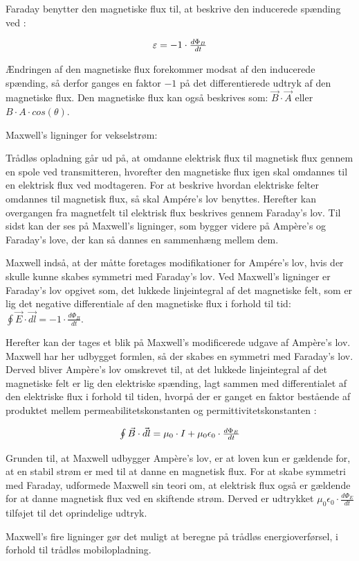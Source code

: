 Faraday benytter den magnetiske flux til, at beskrive den inducerede spænding ved \cite{fysikbog}:

\begin{equation} \label{faraday}
\centerline{$\varepsilon = -1 \cdot \frac{d \Phi_B}{dt}$}
\end{equation}

Ændringen af den magnetiske flux forekommer modsat af den inducerede spænding, så derfor ganges en faktor $-1$ på det differentierede udtryk af den magnetiske flux. Den magnetiske flux kan også beskrives som: $\vec{B} \cdot \vec{A}$ eller $B \cdot A \cdot cos(\theta)$.

Maxwell's ligninger for vekselstrøm:

Trådløs opladning går ud på, at omdanne elektrisk flux til magnetisk flux gennem en spole ved transmitteren, hvorefter den magnetiske flux igen skal omdannes til en elektrisk flux ved modtageren. For at beskrive hvordan elektriske felter omdannes til magnetisk flux, så skal Ampére's lov benyttes. Herefter kan overgangen fra magnetfelt til elektrisk flux beskrives gennem Faraday's lov. Til sidst kan der ses på Maxwell's ligninger, som bygger videre på Ampère's og Faraday's love, der kan så dannes en sammenhæng mellem dem.

Maxwell indså, at der måtte foretages modifikationer for Ampére's lov, hvis der skulle kunne skabes symmetri med Faraday's lov. Ved Maxwell's ligninger er Faraday's lov opgivet som, det lukkede linjeintegral af det magnetiske felt, som er lig det negative differentiale af den magnetiske flux i forhold til tid: $\oint \vec{E} \cdot \vec{dl} = -1 \cdot \frac{d \Phi_B}{dt}$.

Herefter kan der tages et blik på Maxwell's modificerede udgave af Ampère's lov. Maxwell har her udbygget formlen, så der skabes en symmetri med Faraday's lov. Derved bliver Ampère's lov omskrevet til, at det lukkede linjeintegral af det magnetiske felt er lig den elektriske spænding, lagt sammen med differentialet af den elektriske flux i forhold til tiden, hvorpå der er ganget en faktor bestående af produktet mellem permeabilitetskonstanten og permittivitetskonstanten \cite{fysikbog}: 

\begin{equation} \label{maxwell}
\centerline{$\oint \vec{B} \cdot \vec{dl} = \mu_0 \cdot I + \mu_0 \epsilon_0 \cdot \frac{d \Phi_E}{dt}$}
\end{equation}

Grunden til, at Maxwell udbygger Ampère's lov, er at loven kun er gældende for, at en stabil strøm er med til at danne en magnetisk flux. For at skabe symmetri med Faraday, udformede Maxwell sin teori om, at elektrisk flux også er gældende for at danne magnetisk flux ved en skiftende strøm. Derved er udtrykket $\mu_0 \epsilon_0 \cdot \frac{d \Phi_E}{dt}$ tilføjet til det oprindelige udtryk.

Maxwell's fire ligninger gør det muligt at beregne på trådløs energioverførsel, i forhold til trådløs mobilopladning.

\newpage